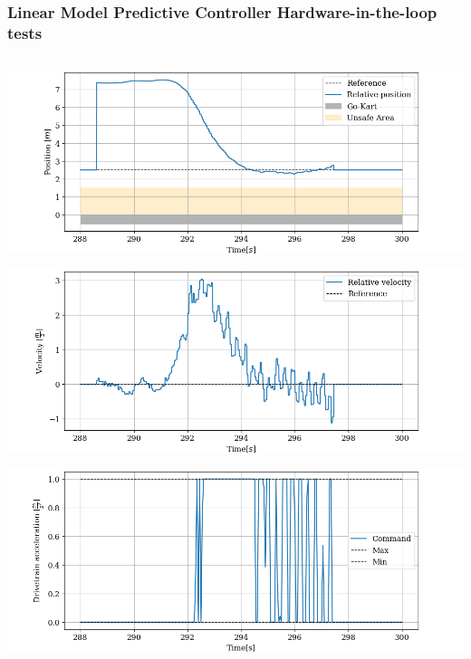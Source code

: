 \documentclass[9pt, aspectratio=169]{beamer}
\begin{document}
\begin{frame}
\frametitle{Linear Model Predictive Controller Hardware-in-the-loop tests}
\begin{columns}

\begin{column}{0.43\textwidth}
	\begin{center}
  		\includegraphics[width=1\textwidth]{Hardware_test/Position} 
	\end{center}
	\vspace{-0.4cm}
	\begin{center}
  		\includegraphics[width=1\textwidth]{Hardware_test/Velocity} 
	\end{center}
	\vspace{-0.4cm}
	\begin{center}
  		\includegraphics[width=1\textwidth]{Hardware_test/Input} 
	\end{center}
\end{column}


\end{columns}
\end{frame}
\end{document}
